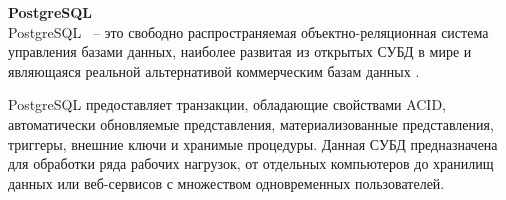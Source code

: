 \newpage

\noindent\textbf{PostgreSQL}\\

PostgreSQL~\cite{postgresql} -- это свободно распространяемая объектно-реляционная система управления базами данных, наиболее развитая из открытых СУБД в мире и являющаяся реальной альтернативой коммерческим базам данных \cite{postgresql-fact}.

PostgreSQL предоставляет транзакции, обладающие свойствами ACID, автоматически обновляемые представления, материализованные представления, триггеры, внешние ключи и хранимые процедуры. Данная СУБД предназначена для обработки ряда рабочих нагрузок, от отдельных компьютеров до хранилищ данных или веб-сервисов с множеством одновременных пользователей. 

